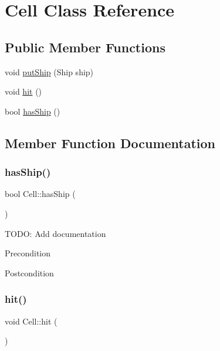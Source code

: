 \hypertarget{classCell}{}\section{Cell Class Reference}
\label{classCell}
\subsection*{Public Member Functions}
\begin{DoxyCompactItemize}
\item 
void \mbox{\hyperlink{classCell_a41ea2ddfdeeba008ecd879a7ccb2b140}{put\+Ship}} (Ship ship)
\item 
void \mbox{\hyperlink{classCell_a07007daae11af44d3dff63b1b9bcbe0f}{hit}} ()
\item 
bool \mbox{\hyperlink{classCell_a8362eba494760f99f6126a8a2f128834}{has\+Ship}} ()
\end{DoxyCompactItemize}


\subsection{Member Function Documentation}
\mbox{\label{classCell_a8362eba494760f99f6126a8a2f128834}} 
\subsubsection{\texorpdfstring{hasShip()}{hasShip()}}
{\footnotesize\ttfamily bool Cell\+::has\+Ship (\begin{DoxyParamCaption}{ }\end{DoxyParamCaption})}

T\+O\+DO\+: Add documentation \begin{DoxyPrecond}{Precondition}

\end{DoxyPrecond}
\begin{DoxyPostcond}{Postcondition}

\end{DoxyPostcond}
\mbox{\label{classCell_a07007daae11af44d3dff63b1b9bcbe0f}} 
\subsubsection{\texorpdfstring{hit()}{hit()}}
{\footnotesize\ttfamily void Cell\+::hit (\begin{DoxyParamCaption}{ }\end{DoxyParamCaption})}

